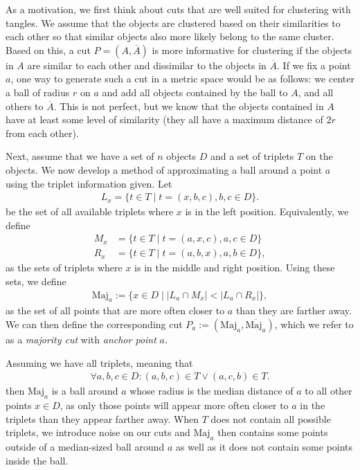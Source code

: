 As a motivation, we first think about cuts that are well suited for clustering with tangles.
We assume that the objects are clustered based on their similarities to each other so that 
similar objects also more likely belong to the same cluster. Based on this, a cut $P = \left(   A, \overline{A} \right) $ is more informative for clustering if the objects in $A$ are similar to each other and
dissimilar to the objects in $\overline{A}$. If we fix a point $a$, one way
to generate such a cut in a metric space would be as follows: 
we center a ball of radius $r$ on $a$ and add all objects contained by the ball to $A$, 
and all others to $\overline{A}$. This is not perfect, but we know that the objects
contained in $A$ have at least some level of similarity (they all have 
a maximum distance of $2r$ from each other). 

Next, assume that we have a set of $n$ objects $D$ and a set of triplets $T$ on the
objects. We now develop a method of approximating a ball around a point $a$ using the
triplet information given. Let 
\begin{align}
L_x = \{t \in T  \mid  t = (x, b,c), b,c \in D\} 
.\end{align}
be the set of all available triplets where $x$ is in the left position. Equivalently, 
we define 
\begin{align}
    M_x &=  \{t \in T  \mid  t = (a, x, c), a,c \in D\} \\
    R_x &=  \{t \in T  \mid  t = (a, b, x), a,b \in D\} 
,\end{align}
as the sets of triplets where $x$ is in the middle and right position. 
Using these sets, we define  
\begin{align}
    \text{Maj} _a := \{x \in D \mid \left| L_a \cap M_x\right| < \left| L_a \cap R_x \right| \}
,\end{align}
as the set of all points that are more often closer to $a$ than they are farther away. 
We can then define the corresponding cut $P_a := ( \text{Maj}_a, \overline{\text{Maj}_a })$, which
we refer to as a \textit{majority cut} with \textit{anchor point} $a$.

Assuming we have all triplets, meaning that 
\begin{align}
    \forall a,b,c \in D: (a,b,c) \in T \vee (a,c,b) \in T
.\end{align}
then $\text{Maj}_a$ is a ball around $a$ whose radius is the median distance of $a$ to all other points $x \in D$, as only those points will appear more often closer to $a$ in the triplets
than they appear farther away. When $T$ does not contain all possible triplets, we introduce 
noise on our cuts and $\text{Maj}_a$ then contains some points outside of a median-sized ball
around $a$ as well as it does not contain some points inside the ball.

